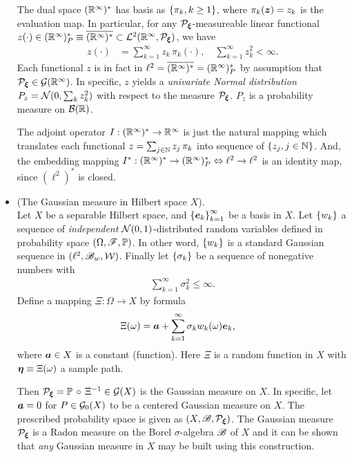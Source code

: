 \documentclass[11pt]{article}
\begin{document}
\begin{itemize}
The dual space $({\mathbb R}^{\infty})^{*}$ has basis as $\left\{\pi_{k}, k\ge 1 \right\}$, where $\pi_{k}(\boldsymbol{z})= z_{k}$ is the evaluation map.  In particular, for any ${\mathcal P}_{\boldsymbol{\xi}}$-measureable linear functional $z(\cdot)\in  ({\mathbb R}^{\infty})_{P}^{*}\equiv\overline{({\mathbb R}^{\infty})^{*}}\subset {\mathcal L}^{2}({\mathbb R}^{\infty}, {\mathcal P}_{\boldsymbol{\xi}})$, we have 
\begin{align}
z(\cdot) &= \sum_{k=1}^{\infty}z_{k}\,\pi_{k}(\cdot),\quad \sum_{k=1}^{\infty}z_{k}^{2}< \infty.
\end{align}
Each functional $z$ is in fact in $\ell^{2}= \overline{({\mathbb R}^{\infty})^{*}}= ({\mathbb R}^{\infty})_{P}^{*}$ by assumption that ${\mathcal P}_{\boldsymbol{\xi}}\in {\mathcal G}({\mathbb R}^{\infty})$. In specific, $z$ yields a \emph{univariate Normal distribution} $P_{z}={\mathcal N}(0, \sum_{k}z_{k}^{2})$ with respect to the measure ${\mathcal P}_{\boldsymbol{\xi}}$. $P_{z}$ is a probability measure on ${\mathcal B}({\mathbb R})$.

The adjoint operator $I: ({\mathbb R}^{\infty})^{*}\rightarrow {\mathbb R}^{\infty}$ is just the natural mapping which translates each functional $z=\sum_{j\in {\mathbb N}}z_{j}\,\pi_{k}$ into sequence of $\left\{z_{j}, j\in {\mathbb N} \right\}$. And, the embedding mapping $I^{*}: ({\mathbb R}^{\infty})^{*} \rightarrow ({\mathbb R}^{\infty})_{P}^{*} \Leftrightarrow \ell^{2} \rightarrow  \ell^{2}$ is an identity map, since $(\ell^{2})^{*}$ is closed.\\[10pt]


\item (The Gaussian measure in Hilbert space $X$). \\
Let $X$ be a separable Hilbert space, and $\left\{\boldsymbol{e}_{k}\right\}_{k=1}^{\infty}$ be a basis in $X$. Let $\left\{w_{k}\right\}$ a sequence of \emph{independent} ${\mathcal N}(0,1)$-distributed random variables defined in probability space $(\Omega, {\mathscr F}, {\mathbb P})$. In other word, $\left\{w_{k}\right\}$ is a standard Gaussian sequence in $(\ell^{2}, {\mathscr B}_{w}, {\mathcal W})$.  Finally let $\left\{\sigma_{k}\right\}$ be a sequence of nonegative numbers with 
\begin{align*}
\sum_{k=1}^{\infty}\sigma^{2}_{k} \le \infty.
\end{align*} Define a mapping $\Xi: \Omega\rightarrow X$ by formula
\begin{align}
\Xi(\omega) &= \boldsymbol{a}+ \sum_{k=1}^{\infty}\sigma_{k}w_{k}(\omega)\boldsymbol{e}_{k},
\end{align} where $\boldsymbol{a}\in X$ is a constant (function). Here $\Xi$ is a random function in $X$ with $\boldsymbol{\eta}\equiv \Xi(\omega)$ a sample path.

Then ${\mathcal P}_{\boldsymbol{\xi}} = {\mathbb P}\,\circ\,\Xi^{-1}\in {\mathcal G}(X)$ is the Gaussian measure on $X$. In specific, let $\boldsymbol{a}=0$ for $P\in {\mathcal G}_{0}(X)$ to be a centered Gaussian measure on  $X$. The prescribed probability space is given as $(X, {\mathscr B}, {\mathcal P}_{\boldsymbol{\xi}})$. The Gaussian measure ${\mathcal P}_{\boldsymbol{\xi}}$ is a Radon measure on the Borel $\sigma$-algebra ${\mathscr B}$ of $X$ and it can be shown that \emph{any} Gaussian measure in $X$ may be built using this construction. 


\end{itemize}
\end{document}
